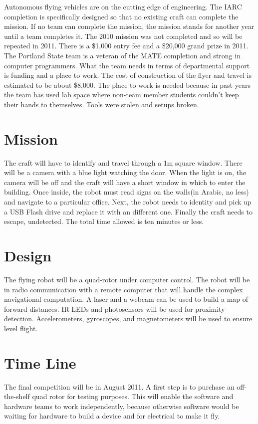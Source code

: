 \documentclass{article}
\begin{document}
Autonomous flying vehicles are on the cutting edge of engineering. The IARC completion is specifically designed so that no existing craft can complete the mission. If no team can complete the mission, the mission stands for another year until a team completes it. The 2010 mission was not completed and so will be repeated in 2011. There is a \$1,000 entry fee and a \$20,000 grand prize in 2011. The Portland State team is a veteran of the MATE completion and strong in computer programmers. What the team needs in terms of departmental support is funding and a place to work. The cost of construction of the flyer and travel is estimated to be about \$8,000. The place to work is needed because in past years the team has used lab space where non-team member students couldn't keep their hands to themselves. Tools were stolen and setups broken. 

\section{Mission}

The craft will have to identify and travel through a 1m square window. There will be a camera with a blue light watching the door. When the light is on, the camera will be off and the craft will have a short window in which to enter the building. Once inside, the robot must read signs on the walls(in Arabic, no less) and navigate to a particular office. Next, the robot needs to identity and pick up a USB Flash drive and replace it with an different one. Finally the craft needs to escape, undetected. The total time allowed is ten minutes or less. 
\section{Design}

The flying robot will be a quad-rotor under computer control. The robot will be in radio communication with a remote computer that will handle the complex navigational computation. A laser and a webcam can be used to build a map of forward distances. IR LEDs and photosensors will be used for proximity detection. Accelerometers, gyroscopes, and magnetometers will be used to ensure level flight. 

\section{Time Line}

The final competition will be in August 2011. A first step is to purchase an off-the-shelf quad rotor for testing purposes. This will enable the software and hardware teams to work independently, because otherwise software would be waiting for hardware to build a device and for electrical to make it fly. 
\end{document}
